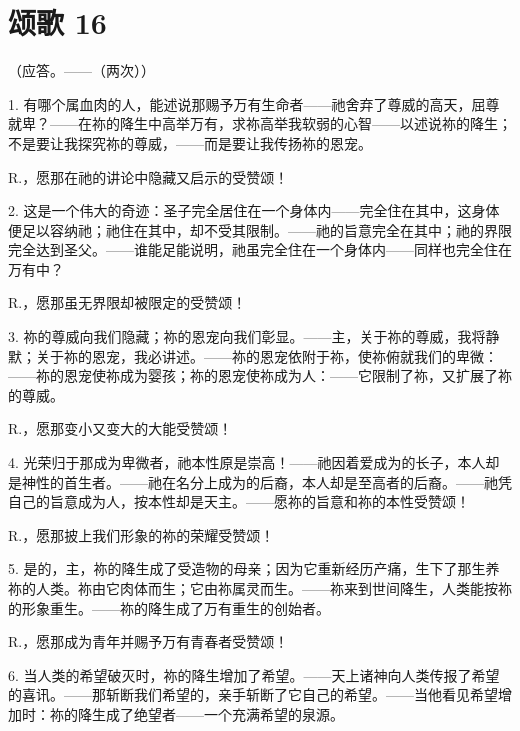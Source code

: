 \section{颂歌 16}

（应答。——（两次））\par

1. 有哪个属血肉的人，能述说那赐予万有生命者——祂舍弃了尊威的高天，屈尊就卑？——在祢的降生中高举万有，求祢高举我软弱的心智——以述说祢的降生；不是要让我探究祢的尊威，——而是要让我传扬祢的恩宠。\par

R.，愿那在祂的讲论中隐藏又启示的受赞颂！\par

2. 这是一个伟大的奇迹：圣子完全居住在一个身体内——完全住在其中，这身体便足以容纳祂；祂住在其中，却不受其限制。——祂的旨意完全在其中；祂的界限完全达到圣父。——谁能足能说明，祂虽完全住在一个身体内——同样也完全住在万有中？\par

R.，愿那虽无界限却被限定的受赞颂！\par

3. 祢的尊威向我们隐藏；祢的恩宠向我们彰显。——主，关于祢的尊威，我将静默；关于祢的恩宠，我必讲述。——祢的恩宠依附于祢，使祢俯就我们的卑微：——祢的恩宠使祢成为婴孩；祢的恩宠使祢成为人：——它限制了祢，又扩展了祢的尊威。\par

R.，愿那变小又变大的大能受赞颂！\par

4. 光荣归于那成为卑微者，祂本性原是崇高！——祂因着爱成为的长子，本人却是神性的首生者。——祂在名分上成为的后裔，本人却是至高者的后裔。——祂凭自己的旨意成为人，按本性却是天主。——愿祢的旨意和祢的本性受赞颂！\par

R.，愿那披上我们形象的祢的荣耀受赞颂！\par

5. 是的，主，祢的降生成了受造物的母亲；因为它重新经历产痛，生下了那生养祢的人类。祢由它肉体而生；它由祢属灵而生。——祢来到世间降生，人类能按祢的形象重生。——祢的降生成了万有重生的创始者。\par

R.，愿那成为青年并赐予万有青春者受赞颂！\par

6. 当人类的希望破灭时，祢的降生增加了希望。——天上诸神向人类传报了希望的喜讯。——那斩断我们希望的，亲手斩断了它自己的希望。——当他看见希望增加时：祢的降生成了绝望者——一个充满希望的泉源。\par

